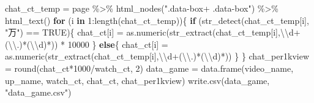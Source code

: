 \documentclass[
]{article}
\newenvironment{Shaded}{\begin{snugshade}}{\end{snugshade}}
\newcommand{\ConstantTok}[1]{\textcolor[rgb]{0.00,0.00,0.00}{#1}}
\newcommand{\ControlFlowTok}[1]{\textcolor[rgb]{0.13,0.29,0.53}{\textbf{#1}}}
\newcommand{\DecValTok}[1]{\textcolor[rgb]{0.00,0.00,0.81}{#1}}
\newcommand{\FunctionTok}[1]{\textcolor[rgb]{0.00,0.00,0.00}{#1}}
\newcommand{\NormalTok}[1]{#1}
\newcommand{\OtherTok}[1]{\textcolor[rgb]{0.56,0.35,0.01}{#1}}
\newcommand{\SpecialCharTok}[1]{\textcolor[rgb]{0.00,0.00,0.00}{#1}}
\newcommand{\StringTok}[1]{\textcolor[rgb]{0.31,0.60,0.02}{#1}}
\begin{document}
\begin{Shaded}
\begin{Highlighting}[]
\NormalTok{chat\_ct\_temp }\OtherTok{=}\NormalTok{ page }\SpecialCharTok{\%\textgreater{}\%} \FunctionTok{html\_nodes}\NormalTok{(}\StringTok{".data{-}box+ .data{-}box"}\NormalTok{) }\SpecialCharTok{\%\textgreater{}\%} \FunctionTok{html\_text}\NormalTok{()}
\ControlFlowTok{for}\NormalTok{ (i }\ControlFlowTok{in} \DecValTok{1}\SpecialCharTok{:}\FunctionTok{length}\NormalTok{(chat\_ct\_temp))\{}
  \ControlFlowTok{if}\NormalTok{ (}\FunctionTok{str\_detect}\NormalTok{(chat\_ct\_temp[i], }\StringTok{"万"}\NormalTok{) }\SpecialCharTok{==} \ConstantTok{TRUE}\NormalTok{)\{}
\NormalTok{    chat\_ct[i] }\OtherTok{=} \FunctionTok{as.numeric}\NormalTok{(}\FunctionTok{str\_extract}\NormalTok{(chat\_ct\_temp[i],}\StringTok{\textquotesingle{}}\SpecialCharTok{\textbackslash{}\textbackslash{}}\StringTok{d+(}\SpecialCharTok{\textbackslash{}\textbackslash{}}\StringTok{.)*(}\SpecialCharTok{\textbackslash{}\textbackslash{}}\StringTok{d)*\textquotesingle{}}\NormalTok{)) }\SpecialCharTok{*} \DecValTok{10000}
\NormalTok{  \}}
  \ControlFlowTok{else}\NormalTok{\{}
\NormalTok{    chat\_ct[i] }\OtherTok{=} \FunctionTok{as.numeric}\NormalTok{(}\FunctionTok{str\_extract}\NormalTok{(chat\_ct\_temp[i],}\StringTok{\textquotesingle{}}\SpecialCharTok{\textbackslash{}\textbackslash{}}\StringTok{d+(}\SpecialCharTok{\textbackslash{}\textbackslash{}}\StringTok{.)*(}\SpecialCharTok{\textbackslash{}\textbackslash{}}\StringTok{d)*\textquotesingle{}}\NormalTok{))}
\NormalTok{  \}}
\NormalTok{\}}
\NormalTok{chat\_per1kview }\OtherTok{=} \FunctionTok{round}\NormalTok{(chat\_ct}\SpecialCharTok{*}\DecValTok{1000}\SpecialCharTok{/}\NormalTok{watch\_ct, }\DecValTok{2}\NormalTok{)}
\NormalTok{data\_game }\OtherTok{=} \FunctionTok{data.frame}\NormalTok{(video\_name, up\_name, watch\_ct, chat\_ct, chat\_per1kview)}
\FunctionTok{write.csv}\NormalTok{(data\_game, }\StringTok{"data\_game.csv"}\NormalTok{)}
\end{Highlighting}
\end{Shaded}
\end{document}

